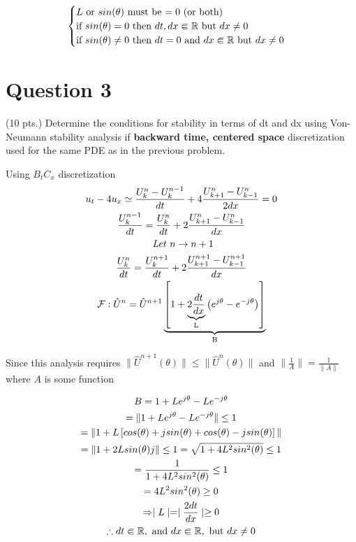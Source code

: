 \documentclass{article}
\begin{document}
\begin{gather*}
\begin{cases}
    \text{$L$ or $sin(\theta)$ must be $= 0$ (or both)} \\
    \text{if $sin(\theta) = 0$ then $dt, dx \Inn \Bbb R $ but $dx \neq 0$}\\
    \text{if $sin(\theta) \neq 0$ then $dt = 0$ and $dx \Inn \Bbb R $ but $dx \neq 0$}
 \end{cases}
\end{gather*}




\section*{Question 3}
(10 pts.) Determine the conditions for stability in terms of dt and dx using Von-Neumann stability analysis if \textbf{backward time, centered space} discretization used for the same PDE as in the previous problem.


Using $B_{t}C_{x}$ discretization
\begin{gather*}
	u_{t} - 4u_{x} \simeq \frac{U^{n}_{k} - U^{n-1}_{k}}{dt} + 4\frac{U^{n}_{k+1} - U^{n}_{k-1}}{2dx} = 0\\
	\frac{U^{n-1}_{k}}{dt} = \frac{U^{n}_{k}}{dt} + 2\frac{U^{n}_{k+1} - U^{n}_{k-1}}{dx}\\
	\text{ \textit{Let} }n \rightarrow n + 1 \\
	\frac{U^{n}_{k}}{dt} = \frac{U^{n+1}_{k}}{dt} + 2\frac{U^{n+1}_{k+1} - U^{n+1}_{k-1}}{dx}\\
	\mathcal{F} : \hat{U}^{n}= \hat{U}^{n+1}\underbrace{\left[ 1 + \underbrace{ 2\frac{dt}{dx}}_{\text{L}}\left(e^{j\theta} - e^{-j\theta}\right) \right]}_{\text{B}}
\end{gather*}

Since this analysis requires $ \|\hat{U}^{n+1}(\theta) \| \leq \| \hat{U}^{n}(\theta) \| $ and $\|\frac{1}{A} \| = \frac{1}{\|A\|}$ where $A$ is some function

\begin{gather*}
  B = 1 + Le^{j\theta} - Le^{-j\theta} \\
  = \| 1+ Le^{j\theta} - Le^{-j\theta} \| \leq 1\\
  = \| 1 + L \left[ cos(\theta) + jsin(\theta) + cos(\theta) - jsin(\theta) \right] \| \\
  = \| 1 + 2L sin(\theta)j \| \leq 1
  = \sqrt{1 + 4L^{2} sin^{2}(\theta)}  \leq 1 \\
  = \frac{1}{1 + 4L^{2} sin^{2}(\theta)}  \leq 1 \\
  = 4L^{2} sin^{2}(\theta) \geq 0 \\
  \Rightarrow  \mid L \mid  = \mid \frac{2dt}{dx} \mid \geq 0\\
  \therefore dt \Inn \Bbb R , \text{ and } dx  \Inn \Bbb R, \text{ but } dx \neq 0
\end{gather*}
\end{document}
